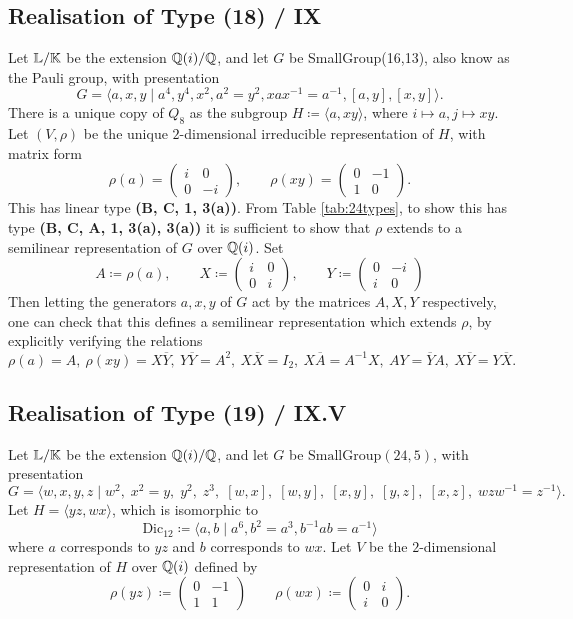 \subsection{Realisation of Type (18) / IX}

Let ${\mathbb L} / {\mathbb K}$ be the extension ${\mathbb Q}(i) / {\mathbb Q}$, and let $G$ be SmallGroup(16,13), also know as the Pauli group, with presentation
\[
G = \langle a, x, y \mid a^4, y^4, x^2, a^2 = y^2, xax^{-1} = a^{-1}, [a,y], [x,y] \rangle.
\]
There is a unique copy of $Q_8$ as the subgroup $H \coloneqq \langle a, xy \rangle$, where $i \mapsto a, j \mapsto xy$. Let $(V, \rho)$ be the unique $2$-dimensional irreducible representation of $H$, with matrix form
\[
\rho(a) = \begin{pmatrix}
    i & 0 \\ 0 & -i
\end{pmatrix}, \qquad \rho(xy) = \begin{pmatrix}
    0 & -1 \\ 1 & 0
\end{pmatrix}.
\]
This has linear type \textbf{(B, C, 1, 3(a))}. From Table \ref{tab:24types}, to show this has type \textbf{(B, C, A, 1, 3(a), 3(a))} it is sufficient to show that $\rho$ extends to a semilinear representation of $G$ over ${\mathbb Q}(i)$. Set
\[
A \coloneqq \rho(a), \qquad X \coloneqq \begin{pmatrix}
    i & 0 \\ 0 & i
\end{pmatrix}, \qquad Y \coloneqq \begin{pmatrix}
    0 & -i \\ i & 0
\end{pmatrix}
\]
Then letting the generators $a, x, y$ of $G$ act by the matrices $A,X,Y$ respectively, one can check that this defines a semilinear representation which extends $\rho$, by explicitly verifying the relations
\[
\rho(a) = A, \ \rho(xy) = X \overline{Y} , \ Y \overline{Y} = A^2, \ X \overline{X} = I_2, \ X \overline{A} = A^{-1} X, \ A Y = \overline{Y} A, \ X \overline{Y} = Y \overline{X}.
\]

\subsection{Realisation of Type (19) / IX.V}\label{sect:realiseIXV} Let ${\mathbb L} / {\mathbb K}$ be the extension ${\mathbb Q}(i) / {\mathbb Q}$, and let $G$ be $\text{SmallGroup}(24,5)$, with presentation
\[
G = \langle w, x, y, z \;|\;
w^2, \;
x^2 = y, \;
y^2, \;
z^3, \;
[w,x], \;
[w,y], \;
[x,y], \;
[y,z], \;
[x,z], \;
w z w^{-1} = z^{-1}
\rangle.
\]
Let $H = \langle yz, wx \rangle$, which is isomorphic to
\[
\text{Dic}_{12} \coloneqq \langle a,b \mid a^6, b^2 = a^3,  b^{-1} a b = a^{-1} \rangle
\]
where $a$ corresponds to $yz$ and $b$ corresponds to $wx$. Let $V$ be the $2$-dimensional representation of $H$ over ${\mathbb Q}(i)$ defined by 
\[
\rho(yz) \coloneqq \begin{pmatrix}
    0 & -1 \\ 1 & 1
\end{pmatrix}
\qquad
\rho(wx) \coloneqq \begin{pmatrix}
    0 & i \\ i & 0
\end{pmatrix}.
\]

